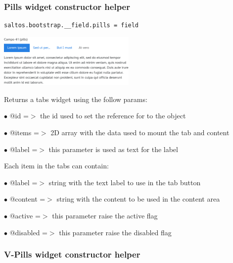 \documentclass[a4paper]{article}
\begin{document}
\hypertarget{toc88}{}
\subsubsection{Pills widget constructor helper}

\begin{lstlisting}
saltos.bootstrap.__field.pills = field
\end{lstlisting}

\begin{center}\includegraphics[width=0.5\textwidth]{../ujest/snaps/test-bootstrap-js-bootstrap-campo-41-pills-1-snap.png}\end{center}

Returns a tabs widget using the follow params:

\begin{compactitem}
\item[\color{myblue}$\bullet$] @id    =$>$ the id used to set the reference for to the object
\item[\color{myblue}$\bullet$] @items =$>$ 2D array with the data used to mount the tab and content
\item[\color{myblue}$\bullet$] @label    =$>$ this parameter is used as text for the label
\end{compactitem}

Each item in the tabs can contain:

\begin{compactitem}
\item[\color{myblue}$\bullet$] @label    =$>$ string with the text label to use in the tab button
\item[\color{myblue}$\bullet$] @content  =$>$ string with the content to be used in the content area
\item[\color{myblue}$\bullet$] @active   =$>$ this parameter raise the active flag
\item[\color{myblue}$\bullet$] @disabled =$>$ this parameter raise the disabled flag
\end{compactitem}

\hypertarget{toc89}{}
\subsubsection{V-Pills widget constructor helper}
\end{document}

